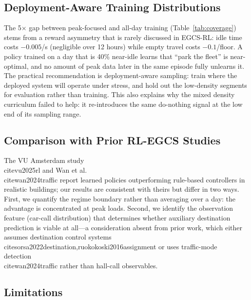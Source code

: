 \documentclass{ieeeaccess}
\begin{document}
\subsection{Deployment-Aware Training Distributions}

The 5$\times$ gap between peak-focused and all-day training
(Table~\ref{tab:coverage}) stems from a reward asymmetry that is
rarely discussed in EGCS-RL: idle time costs $-0.005$/s (negligible
over 12 hours) while empty travel costs $-0.1$/floor. A policy
trained on a day that is 40\% near-idle learns that ``park the
fleet'' is near-optimal, and no amount of peak data later in the
same episode fully unlearns it. The practical recommendation is
deployment-aware sampling: train where the deployed system will
operate under stress, and hold out the low-density segments for
evaluation rather than training. This also explains why the mixed
density curriculum failed to help: it re-introduces the same
do-nothing signal at the low end of its sampling range.

\subsection{Comparison with Prior RL-EGCS Studies}

The VU Amsterdam study~\\cite{vu2025rl} and Wan et al.~\\cite{wan2024traffic}
report learned policies outperforming rule-based controllers in
realistic buildings; our results are consistent with theirs but
differ in two ways. First, we quantify the regime boundary rather
than averaging over a day: the advantage is concentrated at peak
loads. Second, we identify the observation feature (car-call
distribution) that determines whether auxiliary destination
prediction is viable at all---a consideration absent from prior
work, which either assumes destination control
systems~\\cite{sorsa2022destination,ruokokoski2016assignment} or
uses traffic-mode detection~\\cite{wan2024traffic} rather than
hall-call observables.

\subsection{Limitations}
\end{document}
